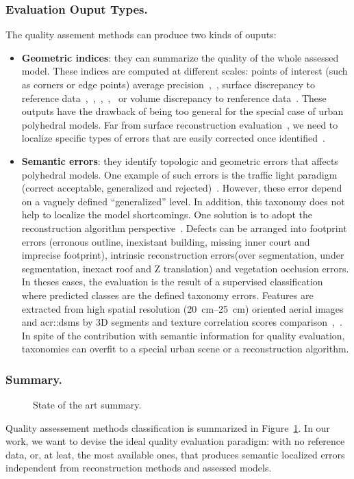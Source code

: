 \documentclass[runningheads]{llncs}
\begin{document}
\subsubsection{Evaluation Ouput Types.}
The quality assement methods can produce two kinds of ouputs:
\begin{itemize}
	\item \textbf{Geometric indices}: they can summarize the quality of the whole assessed model. These indices are computed at different scales: points of interest (such as corners or edge points) average precision~\cite{Kaartinen2005},~\cite{Voegtle2003}, surface discrepancy to reference data~\cite{Kaartinen2005},~\cite{Henricsson1997},~\cite{Zeng2014},~\cite{Lafarge2012},~\cite{li2016boxfitting} or volume discrepancy to renference data~\cite{Zeng2014}. These outputs have the drawback of being too general for the special case of urban polyhedral models. Far from surface reconstruction evaluation~\cite{berger2013benchmark}, we need to localize specific types of errors that are easily corrected once identified~\cite{OudeElberink2010}.
	\item \textbf{Semantic errors}: they identify topologic and geometric errors that affects polyhedral models. One example of such errors is the traffic light paradigm (correct acceptable, generalized and rejected)~\cite{boudet2006supervised}. However, these error depend on a vaguely defined ``generalized'' level. In addition, this taxonomy does not help to localize the model shortcomings. One solution is to adopt the reconstruction algorithm perspective~\cite{Michelin2013}. Defects can be arranged into footprint errors (erronous outline, inexistant building, missing inner court and imprecise footprint), intrinsic reconstruction errors(over segmentation, under segmentation, inexact roof and Z translation) and vegetation occlusion errors. In theses cases, the evaluation is the result of a supervised classification where predicted classes are the defined taxonomy errors. Features are extracted from high spatial resolution (\SIrange{20}{25}{\cm}) oriented aerial images and \glspl{acr::dsm} by 3D segments and texture correlation scores comparison~\cite{boudet2006supervised},~\cite{Michelin2013}. In spite of the contribution with semantic information for quality evaluation, taxonomies can overfit to a special urban scene or a reconstruction algorithm.
\end{itemize}

\subsubsection{Summary.}
\begin{figure}[H]
	\begin{center}
		
		\caption{\label{fig::state_of_art} State of the art summary.}
	\end{center}
\end{figure}
Quality assessement methods classification is summarized in Figure~\ref{fig::state_of_art}. In our work, we want to devise the ideal quality evaluation paradigm: with no reference data, or, at leat, the most available ones, that produces semantic localized errors independent from reconstruction methods and assessed models.
\end{document}
